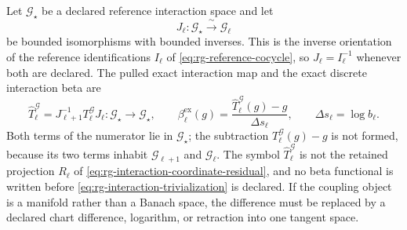 Let $\mathcal G_\star$ be a declared reference interaction space and let
\begin{equation}
J_\ell:\mathcal G_\star\xrightarrow{\ \sim\ }\mathcal G_\ell
\label{eq:rg-interaction-trivialization}
\end{equation}
be bounded isomorphisms with bounded inverses.  This is the inverse orientation
of the reference identifications $I_\ell$ of
\eqref{eq:rg-reference-cocycle}, so $J_\ell=I_\ell^{-1}$ whenever both are
declared.  The pulled exact interaction map and the exact discrete interaction
beta are
\begin{equation}
\widehat T_\ell^{\mathcal G}
=J_{\ell+1}^{-1}T_\ell^{\mathcal G}J_\ell:
\mathcal G_\star\longrightarrow\mathcal G_\star,
\qquad
\beta_\ell^{\mathrm{ex}}(g)
=\frac{\widehat T_\ell^{\mathcal G}(g)-g}{\Delta s_\ell},
\qquad
\Delta s_\ell=\log b_\ell .
\label{eq:rg-interaction-beta}
\end{equation}
Both terms of the numerator lie in $\mathcal G_\star$; the subtraction
$T_\ell^{\mathcal G}(g)-g$ is not formed, because its two terms inhabit
$\mathcal G_{\ell+1}$ and $\mathcal G_\ell$.  The symbol
$\widehat T_\ell^{\mathcal G}$ is not the retained projection $R_\ell$ of
\eqref{eq:rg-interaction-coordinate-residual}, and no beta functional is written
before \eqref{eq:rg-interaction-trivialization} is declared.  If the coupling
object is a manifold rather than a Banach space, the difference must be replaced
by a declared chart difference, logarithm, or retraction into one tangent space.

